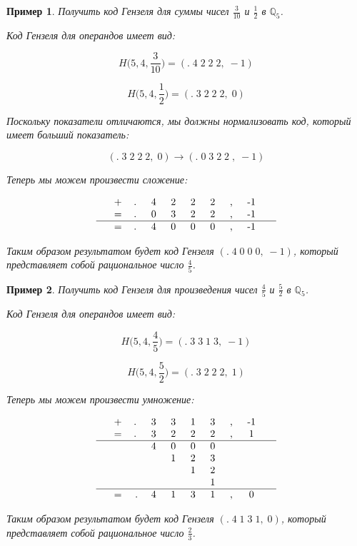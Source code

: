 \documentclass[master, och, diploma, times]{sty/SCWorks}
\theoremstyle{plain}
\newtheorem{exmp}{Пример}[section]
\theoremstyle{definition}
\numberwithin{equation}{section}
\begin{document}
\begin{exmp}
Получить код Гензеля для суммы чисел $\frac{3}{10}$ и $\frac{1}{2}$ в $\mathbb{Q}_5$.

\noindent Код Гензеля для операндов имеет вид:

$$H\bigg(5,4, \frac{3}{10}\bigg)=(.\; 4\; 2\; 2\; 2,\; -1)$$

$$H\bigg(5,4, \frac{1}{2}\bigg)=(.\; 3\; 2\; 2\; 2,\; 0)$$


\noindent Поскольку показатели отличаются, мы должны нормализовать код, который имеет больший показатель:

$$ 
(.\; 3\; 2\; 2\; 2,\; 0) \rightarrow (.\; 0 \; 3\; 2\; 2\; ,\; -1)
$$

\noindent Теперь мы можем произвести сложение:

$$
\begin{tabular}{ccccccccccc}
& + & .\; & 4\; & 2\; & 2\; & 2\; & ,\; & -1\; &  \\
& = & .\; & 0\; & 3\; & 2\; & 2\; & ,\; & -1\; &  \\
\hline
& = & .\; & 4\; & 0\; & 0\; & 0\; & ,\; & -1\; &
\end{tabular}
$$


\noindent Таким образом результатом будет код Гензеля $(.\; 4\; 0\; 0\; 0,\; -1)$, который представляет собой рациональное число $\frac{4}{5}$.
\end{exmp}

\begin{exmp}
Получить код Гензеля для произведения чисел $\frac{4}{5}$ и $\frac{5}{2}$ в $\mathbb{Q}_5$.

\noindent Код Гензеля для операндов имеет вид:

$$H\bigg(5,4, \frac{4}{5}\bigg)=(.\; 3\; 3\; 1\; 3,\; -1)$$

$$H\bigg(5,4, \frac{5}{2}\bigg)=(.\; 3\; 2\; 2\; 2,\; 1)$$

\noindent Теперь мы можем произвести умножение:

$$
\begin{tabular}{cccccccccc}
& + & .\; & 3\; & 3\; & 1\; & 3\; & ,\; & -1\; \\
& = & .\; & 3\; & 2\; & 2\; & 2\; & ,\; & 1\; \\
\hline
& & & 4\; & 0\; & 0\; & 0\; & & & \\
& & & & 1\; & 2\; & 3\; & & & \\
& & & & & 1\; & 2\; & & & \\
& & & & & & 1\; & & & \\
\hline
& = & . & 4\; & 1\; & 3\; & 1\; & ,\; & 0\; &
\end{tabular}
$$


\noindent Таким образом результатом будет код Гензеля $(.\; 4\; 1\; 3\; 1,\; 0)$, который представляет собой рациональное число $\frac{2}{3}$.
\end{exmp}
\end{document}
